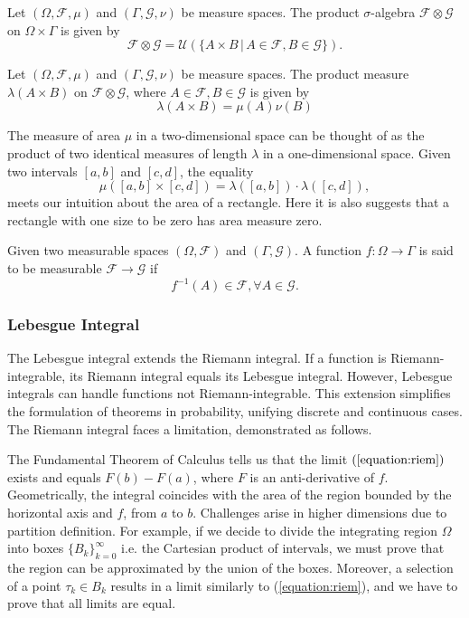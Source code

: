 \begin{definition}
  Let $(\Omega,\mathcal{F},\mu)$ and $(\Gamma,\mathcal{G},\nu)$ be measure spaces. The product $\sigma$-algebra $\mathcal{F}\otimes\mathcal{G}$ on $\Omega\times\Gamma$ is given by
  $$\mathcal{F}\otimes\mathcal{G}=\mathcal{U}(\{A\times B\,|\, A\in\mathcal{F},B\in\mathcal{G}\}).$$
\end{definition}

\begin{definition}
  Let $(\Omega,\mathcal{F},\mu)$ and $(\Gamma,\mathcal{G},\nu)$ be measure spaces. The product measure $\lambda(A\times B)$ on $\mathcal{F}\otimes\mathcal{G}$, where $A\in\mathcal{F},B\in\mathcal{G}$ is given by
  $$\lambda(A\times B)=\mu(A)\nu(B)$$
\end{definition}

\begin{example}
  The measure of area $\mu$ in a two-dimensional space can be thought of as the product of two identical measures of length $\lambda$ in a one-dimensional space. Given two intervals $[a,b]$ and $[c,d]$, the equality
  $$\mu([a,b]\times [c,d])=\lambda([a,b])\cdot\lambda([c,d]),$$
  meets our intuition about the area of a rectangle. Here it is also suggests that a rectangle with one size to be zero has area measure zero.
\end{example}

\begin{definition}
  Given two measurable spaces $(\Omega, \mathcal{F})$ and $(\Gamma,\mathcal{G})$. A function $f:\Omega\to\Gamma$ is said to be measurable $\mathcal{F}\to\mathcal{G}$ if
  $$f^{-1}(A)\in\mathcal{F},\forall A\in \mathcal{G}.$$
\end{definition}

\subsubsection{Lebesgue Integral}
The Lebesgue integral extends the Riemann integral. If a function is Riemann-integrable, its Riemann integral equals its Lebesgue integral. However, Lebesgue integrals can handle functions not Riemann-integrable. This extension simplifies the formulation of theorems in probability, unifying discrete and continuous cases. The Riemann integral faces a limitation, demonstrated as follows.

The Fundamental Theorem of Calculus tells us that the limit $(\ref{equation:riem})$ exists and equals $F(b)-F(a)$, where $F$ is an anti-derivative of $f$. Geometrically, the integral coincides with the area of the region bounded by the horizontal axis and $f$, from $a$ to $b$. Challenges arise in higher dimensions due to partition definition. For example, if we decide to divide the integrating region $\Omega$ into boxes $\{B_k\}_{k=0}^\infty$ i.e. the Cartesian product of intervals, we must prove that the region can be approximated by the union of the boxes. Moreover, a selection of a point $\tau_k\in B_k$ results in a limit similarly to (\ref{equation:riem}), and we have to prove that all limits are equal.

